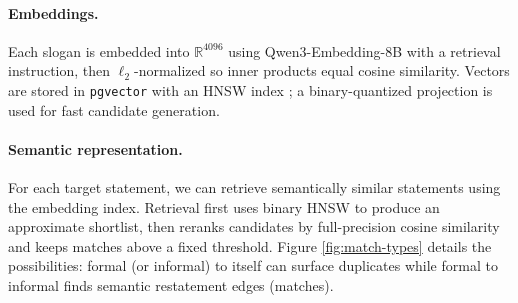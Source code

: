 \label{sec:embeddings-semantic-representation}
\paragraph{Embeddings.} Each slogan is embedded into $\mathbb{R}^{4096}$ using Qwen3-Embedding-8B \cite{zhang2025qwen3embedding} with a retrieval instruction, then $\ell_2$-normalized so inner products equal cosine similarity. Vectors are stored in \texttt{pgvector} with an HNSW index \cite{malkov2018efficientrobustapproximatenearest}; a binary-quantized projection is used for fast candidate generation.

\paragraph{Semantic representation.} For each target statement, we can retrieve semantically similar statements using the embedding index. Retrieval first uses binary HNSW to produce an approximate shortlist, then reranks candidates by full-precision cosine similarity and keeps matches above a     fixed threshold. Figure \ref{fig:match-types} details the possibilities: formal (or informal) to itself can surface duplicates while formal to informal finds semantic restatement edges (matches).
